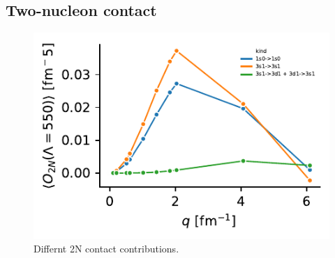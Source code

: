 \documentclass[onecolumn]{revtex4-2}
\begin{document}
\subsection{Two-nucleon contact}
\begin{figure}[htb!]
    \includegraphics{figs/2n-contact.pdf}
    \caption{Differnt 2N contact contributions.}
    \label{}
\end{figure}
\end{document}
